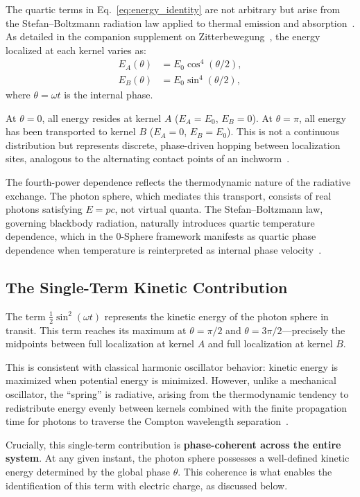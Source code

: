 \documentclass[12pt,letterpaper]{article}
\begin{document}
The quartic terms in Eq.~\eqref{eq:energy_identity} are not arbitrary but arise from the Stefan--Boltzmann radiation law applied to thermal emission and absorption~\cite{hanamura16759284}. As detailed in the companion supplement on Zitterbewegung~\cite{hanamura18356895}, the energy localized at each kernel varies as:
\begin{align}
E_A(\theta) &= E_0 \cos^4(\theta/2), \\
E_B(\theta) &= E_0 \sin^4(\theta/2),
\end{align}
where $\theta = \omega t$ is the internal phase.

At $\theta = 0$, all energy resides at kernel $A$ ($E_A = E_0$, $E_B = 0$). At $\theta = \pi$, all energy has been transported to kernel $B$ ($E_A = 0$, $E_B = E_0$). This is not a continuous distribution but represents discrete, phase-driven hopping between localization sites, analogous to the alternating contact points of an inchworm~\cite{hanamura18511664}.

The fourth-power dependence reflects the thermodynamic nature of the radiative exchange. The photon sphere, which mediates this transport, consists of real photons satisfying $E = pc$, not virtual quanta. The Stefan--Boltzmann law, governing blackbody radiation, naturally introduces quartic temperature dependence, which in the 0-Sphere framework manifests as quartic phase dependence when temperature is reinterpreted as internal phase velocity~\cite{hanamura16759284}.

\subsection{The Single-Term Kinetic Contribution}

The term $\frac{1}{2}\sin^2(\omega t)$ represents the kinetic energy of the photon sphere in transit. This term reaches its maximum at $\theta = \pi/2$ and $\theta = 3\pi/2$—precisely the midpoints between full localization at kernel $A$ and full localization at kernel $B$.

This is consistent with classical harmonic oscillator behavior: kinetic energy is maximized when potential energy is minimized. However, unlike a mechanical oscillator, the ``spring'' is radiative, arising from the thermodynamic tendency to redistribute energy evenly between kernels combined with the finite propagation time for photons to traverse the Compton wavelength separation~\cite{hanamura17765017}.

Crucially, this single-term contribution is \textbf{phase-coherent across the entire system}. At any given instant, the photon sphere possesses a well-defined kinetic energy determined by the global phase $\theta$. This coherence is what enables the identification of this term with electric charge, as discussed below.
\end{document}
